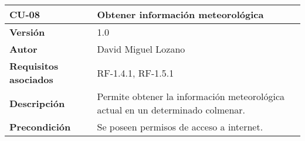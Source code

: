 \begin{longtable}[H]{@{}ll@{}}
\toprule
\begin{minipage}[b]{0.20\columnwidth}\raggedright\strut
\textbf{CU-08}\strut
\end{minipage} & \begin{minipage}[b]{0.74\columnwidth}\raggedright\strut
\textbf{Obtener información meteorológica}\strut
\end{minipage}\tabularnewline
\midrule
\endhead
\begin{minipage}[t]{0.20\columnwidth}\raggedright\strut
\textbf{Versión}\strut
\end{minipage} & \begin{minipage}[t]{0.74\columnwidth}\raggedright\strut
1.0\strut
\end{minipage}\tabularnewline
\begin{minipage}[t]{0.20\columnwidth}\raggedright\strut
\textbf{Autor}\strut
\end{minipage} & \begin{minipage}[t]{0.74\columnwidth}\raggedright\strut
David Miguel Lozano\strut
\end{minipage}\tabularnewline
\begin{minipage}[t]{0.20\columnwidth}\raggedright\strut
\textbf{Requisitos asociados}\strut
\end{minipage} & \begin{minipage}[t]{0.74\columnwidth}\raggedright\strut
RF-1.4.1, RF-1.5.1\strut
\end{minipage}\tabularnewline
\begin{minipage}[t]{0.20\columnwidth}\raggedright\strut
\textbf{Descripción}\strut
\end{minipage} & \begin{minipage}[t]{0.74\columnwidth}\raggedright\strut
Permite obtener la información meteorológica actual en un determinado
colmenar.\strut
\end{minipage}\tabularnewline
\begin{minipage}[t]{0.20\columnwidth}\raggedright\strut
\textbf{Precondición}\strut
\end{minipage} & \begin{minipage}[t]{0.74\columnwidth}\raggedright\strut
Se poseen permisos de acceso a internet.


\end{minipage}
\end{longtable}

